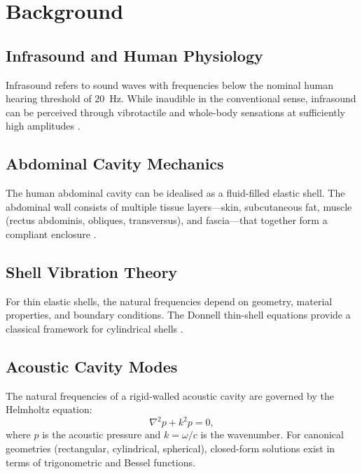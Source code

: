 \section{Background}
\label{sec:background}

\subsection{Infrasound and Human Physiology}

Infrasound refers to sound waves with frequencies below the nominal human
hearing threshold of \SI{20}{\hertz}. While inaudible in the conventional
sense, infrasound can be perceived through vibrotactile and whole-body
sensations at sufficiently high amplitudes \citep{Moller2004}.


\subsection{Abdominal Cavity Mechanics}

The human abdominal cavity can be idealised as a fluid-filled elastic shell.
The abdominal wall consists of multiple tissue layers---skin, subcutaneous
fat, muscle (rectus abdominis, obliques, transversus), and fascia---that
together form a compliant enclosure \citep{Fung1993}.


\subsection{Shell Vibration Theory}

For thin elastic shells, the natural frequencies depend on geometry, material
properties, and boundary conditions. The Donnell thin-shell equations provide
a classical framework for cylindrical shells \citep{Leissa1973, Soedel2004}.


\subsection{Acoustic Cavity Modes}

The natural frequencies of a rigid-walled acoustic cavity are governed by the
Helmholtz equation:
%
\begin{equation}
  \nabla^2 p + k^2 p = 0,
  \label{eq:helmholtz}
\end{equation}
%
where $p$ is the acoustic pressure and $k = \omega / c$ is the wavenumber.
For canonical geometries (rectangular, cylindrical, spherical), closed-form
solutions exist in terms of trigonometric and Bessel functions.

